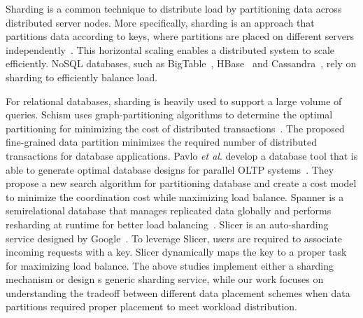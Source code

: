 Sharding is a common technique to distribute load by
partitioning data across distributed server nodes.
More specifically, sharding is an approach that partitions data
according to keys, where partitions are placed
on different servers independently~\cite{Cattell2011}.
This horizontal scaling enables a distributed system to scale efficiently.
NoSQL databases, such as BigTable~\cite{Chang2008}, HBase~\cite{hbase}
and Cassandra~\cite{Lakshman2010}, rely on sharding
to efficiently balance load.

For relational databases, sharding is heavily used to support
a large volume of queries.
Schism uses graph-partitioning algorithms
to determine the optimal partitioning
for minimizing the cost of distributed transactions~\cite{Curino2010}.
The proposed fine-grained data partition minimizes
the required number of distributed transactions for database applications.
Pavlo \emph{et al}. develop a database tool that is able to generate
optimal database designs for parallel OLTP systems~\cite{Pavlo2012}.
They propose a new search algorithm for partitioning database and
create a cost model to minimize the coordination cost
while maximizing load balance.
Spanner is a semirelational database that
manages replicated data globally and performs resharding
at runtime for better load balancing~\cite{Corbett2013}.
Slicer is an auto-sharding service designed by Google~\cite{Adya2016}.
To leverage Slicer, users are required to
associate incoming requests with a key.
Slicer dynamically maps the key to a proper task
for maximizing load balance.
The above studies implement either
a sharding mechanism or design s generic sharding service,
while our work focuses on understanding the tradeoff
between different data placement schemes
when data partitions required proper placement to
meet workload distribution.